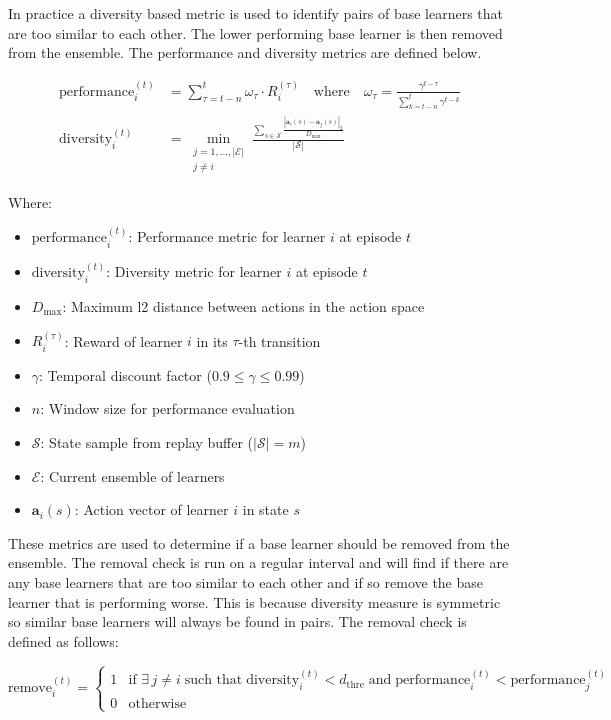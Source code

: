 In practice a diversity based metric is used to identify pairs of base learners that are too similar to each other. The lower performing base learner is then removed from the ensemble. The performance and diversity metrics are defined below.


\begin{align*}
    \text{performance}_i^{(t)} &= \sum_{\tau=t-n}^{t} \omega_\tau \cdot R_i^{(\tau)} 
        \quad \text{where} \quad 
        \omega_\tau = \frac{\gamma^{t-\tau}}{\sum_{k=t-n}^{t} \gamma^{t-k}} \\
    \text{diversity}_i^{(t)} &=  \min_{\substack{j=1, ..., |\mathcal{E}| \\ j \neq i}} \frac{\sum_{s \in \mathcal{S}}  
        \frac{\left| \bm{a}_i(s) - \bm{a}_j(s) \right|_2}{D_{\max}}}{|\mathcal{S}|}
\end{align*}


Where:
\begin{itemize}
    \item $\text{performance}_i^{(t)}$: Performance metric for learner $i$ at episode $t$
    \item $\text{diversity}_i^{(t)}$: Diversity metric for learner $i$ at episode $t$
    \item $D_{\max}$: Maximum l2 distance between actions in the action space
    \item $R_i^{(\tau)}$: Reward of learner $i$ in its $\tau$-th transition
    \item $\gamma$: Temporal discount factor ($0.9 \leq \gamma \leq 0.99$)
    \item $n$: Window size for performance evaluation
    \item $\mathcal{S}$: State sample from replay buffer ($|\mathcal{S}| = m$)
    \item $\mathcal{E}$: Current ensemble of learners
    \item $\bm{a}_i(s)$: Action vector of learner $i$ in state $s$
\end{itemize}

These metrics are used to determine if a base learner should be removed from the ensemble. The removal check is run on a regular interval and will find if there are any base learners that are too similar to each other and if so remove the base learner that is performing worse. This is because diversity measure is symmetric so similar base learners will always be found in pairs. The removal check is defined as follows:

\begin{equation*}
    \text{remove}_i^{(t)} = 
    \begin{cases} 
        1 & \text{if } \exists\, j \neq i \;\text{such that}\; \text{diversity}_i^{(t)} < d_{\text{thre}} \;\text{and}\; \text{performance}_i^{(t)} < \text{performance}_j^{(t)} \\
        0 & \text{otherwise}
    \end{cases}
\end{equation*}

